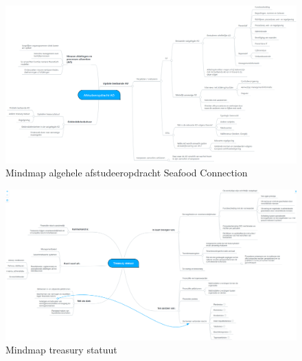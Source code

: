 \documentclass[10pt,a4paper,twoside]{report}
\begin{document}
\begin{figure}
    \centering
    \includegraphics[angle=90,height=0.95\textheight]{afstudeeropdracht}
    \caption{Mindmap algehele afstudeeropdracht Seafood Connection}
    \label{fig:mmopdracht}
\end{figure}

\begin{figure}
    \centering
    \includegraphics[angle=90,height=0.95\textheight]{treasury}
    \caption{Mindmap treasury statuut}
    \label{fig:mmtreasury}
\end{figure}
\printbibliography
{}
\end{document}
